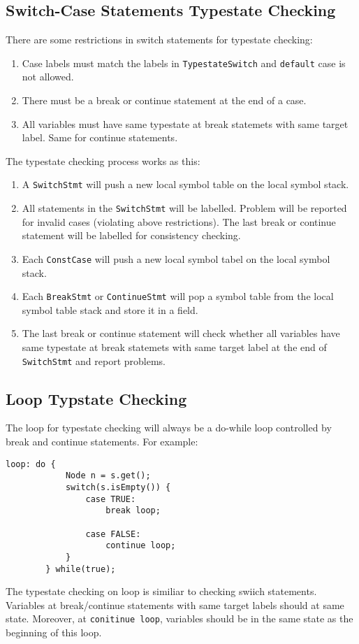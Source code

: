 \documentclass[]{article}
\begin{document}
\subsection{Switch-Case Statements Typestate Checking}
There are some restrictions in switch statements for typestate checking:
\begin{enumerate}
	\item Case labels must match the labels in \texttt{TypestateSwitch} and \texttt{default} case is not allowed.
	\item There must be a break or continue statement at the end of a case.
	\item All variables must have same typestate at break statemets with same target label. Same for continue statements.
\end{enumerate}
The typestate checking process works as this:
\begin{enumerate}
	\item A \texttt{SwitchStmt} will push a new local symbol table on the local symbol stack.
	\item All statements in the \texttt{SwitchStmt} will be labelled. Problem will be reported for invalid cases (violating above restrictions). The last break or continue statement will be labelled for consistency checking.
	\item Each \texttt{ConstCase} will push a new local symbol tabel on the local symbol stack.
	\item Each \texttt{BreakStmt} or \texttt{ContinueStmt} will pop a symbol table from the local symbol table stack and store it in a field.
	\item The last break or continue statement will check whether all variables have same typestate at break statemets with same target label at the end of \texttt{SwitchStmt} and report problems.
\end{enumerate}

\subsection{Loop Typstate Checking}
The loop for typestate checking will always be a do-while loop controlled by break and continue statements. For example:
\begin{lstlisting}
loop: do {
			Node n = s.get();
			switch(s.isEmpty()) {
				case TRUE:
					break loop;

				case FALSE:
					continue loop;
			}
		} while(true);
\end{lstlisting}
The typestate checking on loop is similiar to checking swiich statements. Variables at break/continue statements with same target labels should at same state. Moreover, at \texttt{conitinue loop}, variables should be in the same state as the beginning of this loop.
\end{document}
